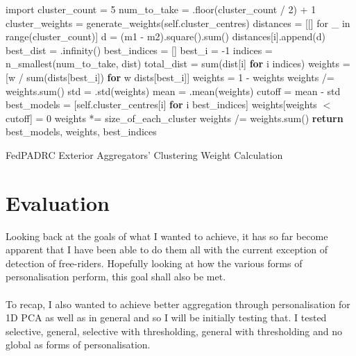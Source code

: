 \begin{algorithm}[htbp]
\SetAlgoLined
\DontPrintSemicolon
{}
\newcommand\mycommfont[1]{\footnotesize\ttfamily\textcolor{blue}{#1}}
 import \KwMath\;
 \;
 cluster\_count = 5\;
 num\_to\_take = \KwMath.floor(cluster\_count / 2) + 1\;
 cluster\_weights = generate\_weights(self.cluster\_centres)\;
 distances = [[] for \_ in range(cluster\_count)]\;
 \;
  {
   {
   d = (m1 - m2).square().sum()\;
   distances[i].append(d)\;
  }
 }
 \;
 best\_dist = \KwMath.infinity()\;
 best\_indices = []\;
 best\_i = -1\;
 \;
  {
  indices = n\_smallest(num\_to\_take, dist)\;
  total\_dist = sum(dist[i] \textbf{for} i \KwIn indices)\;
  \;
 }
 \;
 weights = [w / sum(dists[best\_i]) \textbf{for} w \KwIn dists[best\_i]]\;
 weights = 1 - weights\;
 weights /= weights.sum()\;
 \;
 std = \KwMath.std(weights)\;
 mean = \KwMath.mean(weights)\;
 cutoff = mean - std\;
 \;
 best\_models = [self.cluster\_centres[i] \textbf{for} i \KwIn best\_indices]\;
 weights[weights $<$ cutoff] = 0\;
 weights *= size\_of\_each\_cluster\;
 weights /= weights.sum()\;
 \;
 \textbf{return} best\_models, weights, best\_indices\;

 \caption{FedPADRC Exterior Aggregators' Clustering Weight Calculation}
 \label{alg:my_alg}
\end{algorithm}

\section{Evaluation}
Looking back at the goals of what I wanted to achieve, it has so far become apparent that I have been able to do them all with the current exception of detection of free-riders.
Hopefully looking at how the various forms of personalisation perform, this goal shall also be met.
\\ \\
To recap, I also wanted to achieve better aggregation through personalisation for 1D PCA as well as in general and so I will be initially testing that.
I tested selective, general, selective with thresholding, general with thresholding and no global as forms of personalisation.

